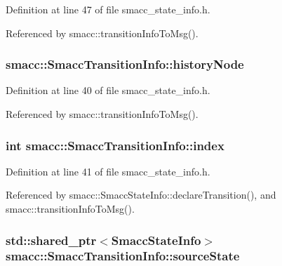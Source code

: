 Definition at line 47 of file smacc\+\_\+state\+\_\+info.\+h.



Referenced by smacc\+::transition\+Info\+To\+Msg().

\subsubsection[{\texorpdfstring{history\+Node}{historyNode}}]{ smacc\+::\+Smacc\+Transition\+Info\+::history\+Node}\hypertarget{structsmacc_1_1SmaccTransitionInfo_a3e904998932b58d36a2995982d36cf68}{}\label{structsmacc_1_1SmaccTransitionInfo_a3e904998932b58d36a2995982d36cf68}


Definition at line 40 of file smacc\+\_\+state\+\_\+info.\+h.



Referenced by smacc\+::transition\+Info\+To\+Msg().

\subsubsection[{\texorpdfstring{index}{index}}]{\setlength{\rightskip}{0pt plus 5cm}int smacc\+::\+Smacc\+Transition\+Info\+::index}\hypertarget{structsmacc_1_1SmaccTransitionInfo_a629160558f789d6812c7edd54707e053}{}\label{structsmacc_1_1SmaccTransitionInfo_a629160558f789d6812c7edd54707e053}


Definition at line 41 of file smacc\+\_\+state\+\_\+info.\+h.



Referenced by smacc\+::\+Smacc\+State\+Info\+::declare\+Transition(), and smacc\+::transition\+Info\+To\+Msg().

\subsubsection[{\texorpdfstring{source\+State}{sourceState}}]{\setlength{\rightskip}{0pt plus 5cm}std\+::shared\+\_\+ptr$<${\bf Smacc\+State\+Info}$>$ smacc\+::\+Smacc\+Transition\+Info\+::source\+State}\hypertarget{structsmacc_1_1SmaccTransitionInfo_a959ee5f468cba2f7b19e4d35f94cc564}{}\label{structsmacc_1_1SmaccTransitionInfo_a959ee5f468cba2f7b19e4d35f94cc564}



